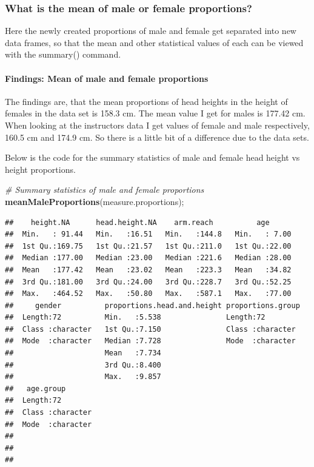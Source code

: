\documentclass[]{article}
\newenvironment{Shaded}{\begin{snugshade}}{\end{snugshade}}
\newcommand{\CommentTok}[1]{\textcolor[rgb]{0.56,0.35,0.01}{\textit{#1}}}
\newcommand{\KeywordTok}[1]{\textcolor[rgb]{0.13,0.29,0.53}{\textbf{#1}}}
\newcommand{\NormalTok}[1]{#1}
\begin{document}
\newpage

\subsubsection{What is the mean of male or female proportions?}
\label{sec:appendix-mean-gender-proportions}

Here the newly created proportions of male and female get separated into
new data frames, so that the mean and other statistical values of each
can be viewed with the summary() command.

\paragraph{Findings: Mean of male and female proportions}
\label{sec:appendix-findings-mean-gender-proportions}

The findings are, that the mean proportions of head heights in the
height of females in the data set is 158.3 cm. The mean value I get for
males is 177.42 cm. When looking at the instructors data I get values of
female and male respectively, 160.5 cm and 174.9 cm. So there is a
little bit of a difference due to the data sets.

Below is the code for the summary statistics of male and female head
height vs height proportions.

\begin{Shaded}
\begin{Highlighting}[]
\CommentTok{\# Summary statistics of male and female proportions}
\KeywordTok{meanMaleProportions}\NormalTok{(measure.proportions);}
\end{Highlighting}
\end{Shaded}

\begin{verbatim}
##    height.NA      head.height.NA    arm.reach          age       
##  Min.   : 91.44   Min.   :16.51   Min.   :144.8   Min.   : 7.00  
##  1st Qu.:169.75   1st Qu.:21.57   1st Qu.:211.0   1st Qu.:22.00  
##  Median :177.00   Median :23.00   Median :221.6   Median :28.00  
##  Mean   :177.42   Mean   :23.02   Mean   :223.3   Mean   :34.82  
##  3rd Qu.:181.00   3rd Qu.:24.00   3rd Qu.:228.7   3rd Qu.:52.25  
##  Max.   :464.52   Max.   :50.80   Max.   :587.1   Max.   :77.00  
##     gender          proportions.head.and.height proportions.group 
##  Length:72          Min.   :5.538               Length:72         
##  Class :character   1st Qu.:7.150               Class :character  
##  Mode  :character   Median :7.728               Mode  :character  
##                     Mean   :7.734                                 
##                     3rd Qu.:8.400                                 
##                     Max.   :9.857                                 
##   age.group        
##  Length:72         
##  Class :character  
##  Mode  :character  
##                    
##                    
## 
\end{verbatim}
\end{document}
